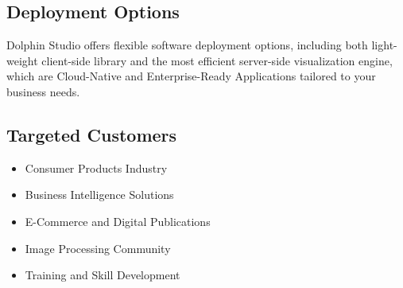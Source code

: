 \documentclass{amm-pst-report}
\begin{document}
\subsection{Deployment Options}
Dolphin Studio offers flexible software deployment options, including both light-weight client-side library and the most efficient server-side visualization engine, which are Cloud-Native and Enterprise-Ready Applications tailored to your business needs.


\subsection{Targeted Customers}
\begin{itemize}
\item Consumer Products Industry
\item Business Intelligence Solutions
\item E-Commerce and Digital Publications
\item Image Processing Community
\item Training and Skill Development
\end{itemize}







\end{document}
